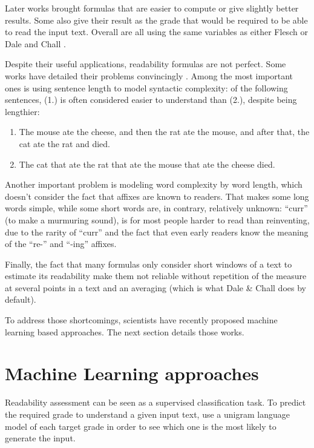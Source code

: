 \documentclass[a4paper, 11pt, onepage]{scrreprt}
\begin{document}
Later works brought formulas that are easier to compute or give
slightly better results. Some also give their result as the grade that
would be required to be able to read the input text. Overall are all
using the same variables as either Flesch or Dale and Chall
\cite{mclaughlin1969smog, kincaid1975derivation,
  chall1995readability}.

Despite their useful applications, readability formulas are not
perfect. Some works have detailed their problems convincingly
\cite{duffy1985readability, schriver2000readability}. Among the most
important ones is using sentence length to model syntactic complexity:
of the following sentences, (1.) is often considered easier to
understand than (2.), despite being lengthier:
\begin{enumerate}
\item The mouse ate the cheese, and then the rat ate the mouse, and
  after that, the cat ate the rat and died.
\item The cat that ate the rat that ate the mouse that ate the cheese
  died.
\end{enumerate}
Another important problem is modeling word complexity by word length,
which doesn't consider the fact that affixes are known to
readers. That makes some long words simple, while some short words
are, in contrary, relatively unknown: “curr” (to make a murmuring
sound), is for most people harder to read than reinventing, due to the
rarity of “curr” and the fact that even early readers know the meaning
of the “re-” and “-ing” affixes.

Finally, the fact that many formulas only consider short windows of a
text to estimate its readability make them not reliable without
repetition of the measure at several points in a text and an averaging
(which is what Dale \& Chall does by default).

To address those shortcomings, scientists have recently proposed
machine learning based approaches. The next section details those
works.

\section{Machine Learning approaches}
\label{sec:ml-approaches}

Readability assessment can be seen as a supervised classification
task. To predict the required grade to understand a given input text,
\cite{callanlanguage} use a unigram language model of each target
grade in order to see which one is the most likely to generate the
input.
\end{document}
